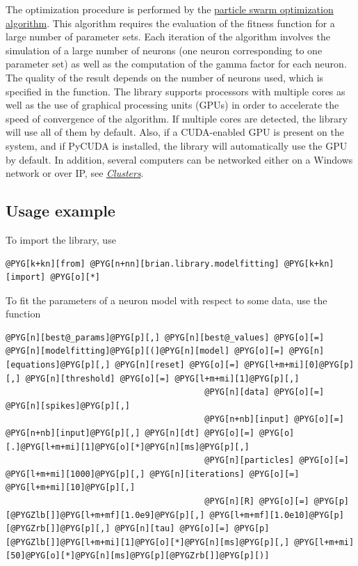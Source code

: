 \documentclass[letterpaper,10pt,english]{manual}
\begin{document}
The optimization procedure is performed by the
\href{http://en.wikipedia.org/wiki/Particle\_swarm\_optimization}{particle swarm optimization algorithm}.
This algorithm requires the evaluation of the fitness function for a large number of parameter
sets. Each iteration of the algorithm
involves the simulation of a large number of neurons (one neuron corresponding to one parameter set)
as well as the computation of the gamma factor for each neuron.
The quality of the result depends
on the number of neurons used, which is specified in the \hyperlink{brian.library.modelfitting.modelfitting}{} function.
The library supports processors with multiple cores as well
as the use of graphical processing
units (GPUs) in order to accelerate the speed of convergence of the algorithm.
If multiple cores are detected, the library will use all of them by default.
Also, if a CUDA-enabled GPU is present on the system, and if PyCUDA is installed,
the library will automatically use the GPU by default. In addition, several computers
can be networked either on a Windows network or over IP, see \hyperlink{modelfitting-clusters}{\emph{Clusters}}.


\subsection{Usage example}

To import the library, use

\begin{Verbatim}[commandchars=@\[\]]
@PYG[k+kn][from] @PYG[n+nn][brian.library.modelfitting] @PYG[k+kn][import] @PYG[o][*]
\end{Verbatim}

To fit the parameters of a neuron model with respect to some data, use the
\hyperlink{brian.library.modelfitting.modelfitting}{} function

\begin{Verbatim}[commandchars=@\[\]]
@PYG[n][best@_params]@PYG[p][,] @PYG[n][best@_values] @PYG[o][=] @PYG[n][modelfitting]@PYG[p][(]@PYG[n][model] @PYG[o][=] @PYG[n][equations]@PYG[p][,] @PYG[n][reset] @PYG[o][=] @PYG[l+m+mi][0]@PYG[p][,] @PYG[n][threshold] @PYG[o][=] @PYG[l+m+mi][1]@PYG[p][,]
                                        @PYG[n][data] @PYG[o][=] @PYG[n][spikes]@PYG[p][,]
                                        @PYG[n+nb][input] @PYG[o][=] @PYG[n+nb][input]@PYG[p][,] @PYG[n][dt] @PYG[o][=] @PYG[o][.]@PYG[l+m+mi][1]@PYG[o][*]@PYG[n][ms]@PYG[p][,]
                                        @PYG[n][particles] @PYG[o][=] @PYG[l+m+mi][1000]@PYG[p][,] @PYG[n][iterations] @PYG[o][=] @PYG[l+m+mi][10]@PYG[p][,]
                                        @PYG[n][R] @PYG[o][=] @PYG[p][@PYGZlb[]]@PYG[l+m+mf][1.0e9]@PYG[p][,] @PYG[l+m+mf][1.0e10]@PYG[p][@PYGZrb[]]@PYG[p][,] @PYG[n][tau] @PYG[o][=] @PYG[p][@PYGZlb[]]@PYG[l+m+mi][1]@PYG[o][*]@PYG[n][ms]@PYG[p][,] @PYG[l+m+mi][50]@PYG[o][*]@PYG[n][ms]@PYG[p][@PYGZrb[]]@PYG[p][)]
\end{Verbatim}
\end{document}
